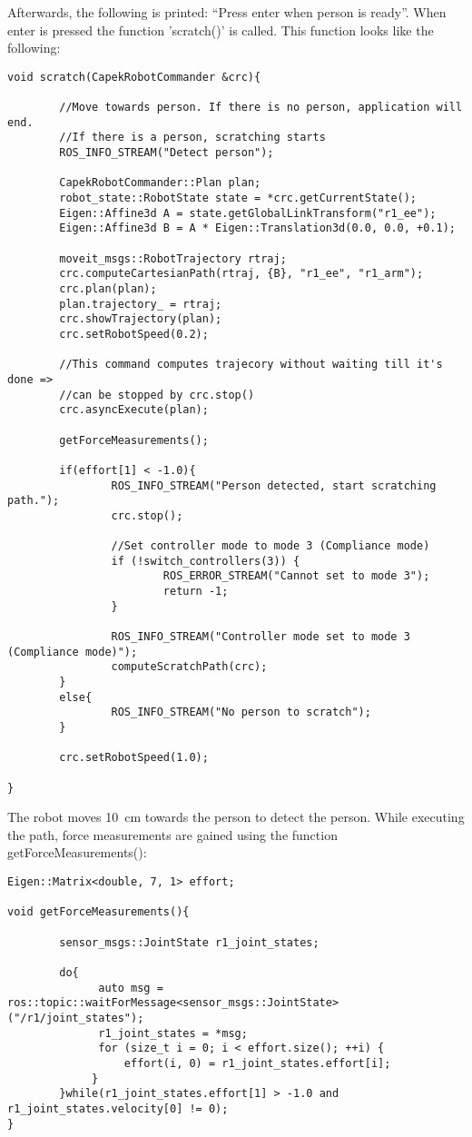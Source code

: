 \documentclass[11pt,a4paper]{report}
\begin{document}
Afterwards, the following is printed: ``Press enter when person is ready''. When enter is pressed the function 'scratch()' is called. This function looks like the following:
\begin{verbatim}
void scratch(CapekRobotCommander &crc){

	    //Move towards person. If there is no person, application will end.
	    //If there is a person, scratching starts
	    ROS_INFO_STREAM("Detect person");

	    CapekRobotCommander::Plan plan;
	    robot_state::RobotState state = *crc.getCurrentState();
	    Eigen::Affine3d A = state.getGlobalLinkTransform("r1_ee");
	    Eigen::Affine3d B = A * Eigen::Translation3d(0.0, 0.0, +0.1);

	    moveit_msgs::RobotTrajectory rtraj;
	    crc.computeCartesianPath(rtraj, {B}, "r1_ee", "r1_arm");
	    crc.plan(plan);
	    plan.trajectory_ = rtraj;
	    crc.showTrajectory(plan);
	    crc.setRobotSpeed(0.2);

	    //This command computes trajecory without waiting till it's done =>
	    //can be stopped by crc.stop()
	    crc.asyncExecute(plan);

	    getForceMeasurements();

	    if(effort[1] < -1.0){
		        ROS_INFO_STREAM("Person detected, start scratching path.");
		        crc.stop();

		        //Set controller mode to mode 3 (Compliance mode)
		        if (!switch_controllers(3)) {
			            ROS_ERROR_STREAM("Cannot set to mode 3");
			            return -1;
		        }

		        ROS_INFO_STREAM("Controller mode set to mode 3 (Compliance mode)");
		        computeScratchPath(crc);
	    }
	    else{
		        ROS_INFO_STREAM("No person to scratch");
	    }
	
	    crc.setRobotSpeed(1.0);
	
}
\end{verbatim}
The robot moves 10~cm towards the person to detect the person. While executing the path, force measurements are gained using the function getForceMeasurements():
\begin{verbatim}
Eigen::Matrix<double, 7, 1> effort;

void getForceMeasurements(){

	    sensor_msgs::JointState r1_joint_states;

	    do{
		      auto msg = ros::topic::waitForMessage<sensor_msgs::JointState>("/r1/joint_states");
		      r1_joint_states = *msg;
		      for (size_t i = 0; i < effort.size(); ++i) {
        		  effort(i, 0) = r1_joint_states.effort[i];
    		 }
	    }while(r1_joint_states.effort[1] > -1.0 and r1_joint_states.velocity[0] != 0);
}
\end{verbatim}
\end{document}
